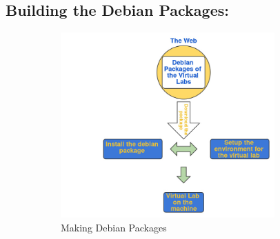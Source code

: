 \documentclass[conference]{IEEEtran}
\begin{document}
  \subsection{Building the Debian Packages:}
  \begin{figure}
    \begin{subfigure}{\columnwidth}
      \includegraphics[width=0.9\textwidth,height=1.4\textwidth]{debian_packaging}
      \caption{Making Debian Packages}
    \end{subfigure} 
    ~
    \begin{subfigure}{\columnwidth}

\end{subfigure}
\end{figure}
\end{document}
